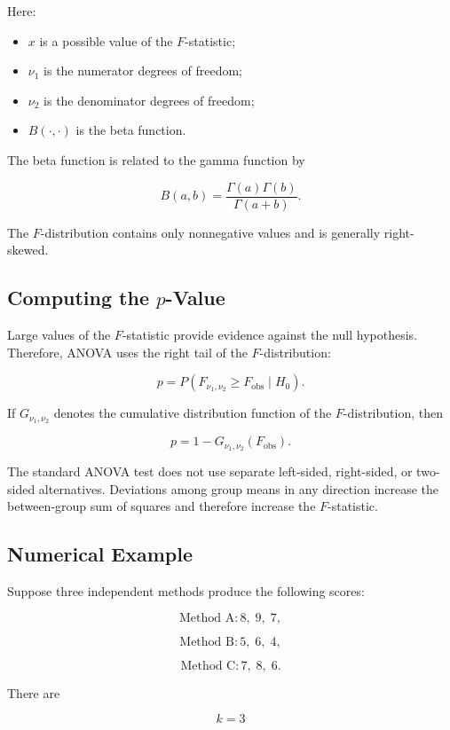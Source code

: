 \documentclass[11pt]{article}
\begin{document}
Here:

\begin{itemize}[noitemsep]
    \item \(x\) is a possible value of the \(F\)-statistic;
    \item \(\nu_1\) is the numerator degrees of freedom;
    \item \(\nu_2\) is the denominator degrees of freedom;
    \item \(B(\cdot,\cdot)\) is the beta function.
\end{itemize}

The beta function is related to the gamma function by

\[
B(a,b)
=
\frac{
\Gamma(a)\Gamma(b)
}{
\Gamma(a+b)
}.
\]

The \(F\)-distribution contains only nonnegative values and is generally
right-skewed.

\subsection{Computing the \(p\)-Value}

Large values of the \(F\)-statistic provide evidence against the null
hypothesis. Therefore, ANOVA uses the right tail of the
\(F\)-distribution:

\[
\boxed{
p
=
P\left(
F_{\nu_1,\nu_2}
\geq
F_{\mathrm{obs}}
\mid H_0
\right).
}
\]

If \(G_{\nu_1,\nu_2}\) denotes the cumulative distribution function of
the \(F\)-distribution, then

\[
\boxed{
p
=
1-
G_{\nu_1,\nu_2}
(F_{\mathrm{obs}}).
}
\]

The standard ANOVA test does not use separate left-sided, right-sided,
or two-sided alternatives. Deviations among group means in any direction
increase the between-group sum of squares and therefore increase the
\(F\)-statistic.

\subsection{Numerical Example}

Suppose three independent methods produce the following scores:

\[
\text{Method A}: 8,\;9,\;7,
\]

\[
\text{Method B}: 5,\;6,\;4,
\]

\[
\text{Method C}: 7,\;8,\;6.
\]

There are

\[
k=3
\]
\end{document}
